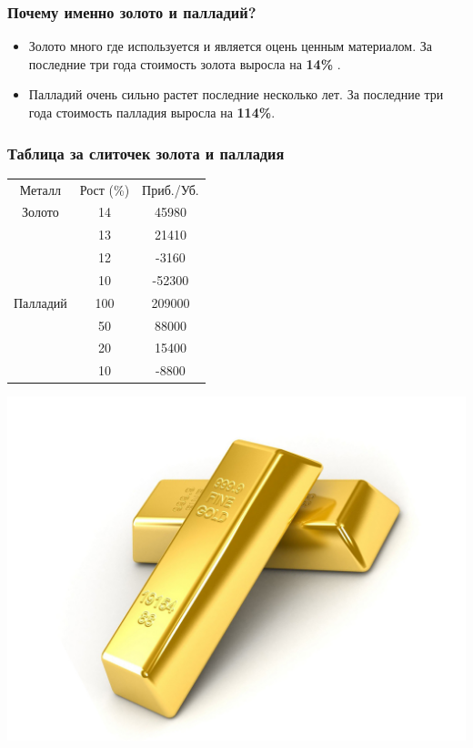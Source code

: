 \documentclass{beamer}
\newcommand{\col}{\textcolor[rgb]{0.2,0.,0.55}}
\begin{document}
		\begin{frame} \frametitle{Почему именно золото и палладий?}
		
		\begin{itemize}
		\item Золото много где используется и является оцень ценным материалом.
За последние три года стоимость золота выросла на \textbf{\col{14\%}} .

\vspace{10pt}
		\item Палладий очень сильно растет последние несколько лет.
За последние три года стоимость палладия выросла на \textbf{\col{114\%}}.
		\end{itemize}
		

		\end{frame}
		\begin{frame}
			\frametitle{Таблица за слиточек золота и палладия}
				\begin{minipage}[h]{0.5\linewidth}
				\begin{footnotesize}
				\begin{tabular}{ccc}
				\rowcolor{blue!30} Металл & Рост (\%) & Приб./Уб. \\
				\rowcolor{yellow!30}Золото & 14 & 45980\\
				\rowcolor{yellow!15} & 13 & 21410\\
				\rowcolor{yellow!30} & 12 & -3160\\
				\rowcolor{yellow!15} & 10 & -52300\\
				\rowcolor{gray!20}Палладий & 100 & 209000\\
				\rowcolor{gray!10} & 50 & 88000\\
				\rowcolor{gray!20} & 20 & 15400\\
				\rowcolor{gray!10} & 10 & -8800\\
				\end{tabular}
				\end{footnotesize}
				\end{minipage}
				\hspace{5pt}
				\begin{minipage}[h]{0.4\linewidth}
				\begin{center}
				{\includegraphics[width=1\linewidth]{p/metall.jpg}}
				

\end{center}
\end{minipage}
\end{frame}
\end{document}
